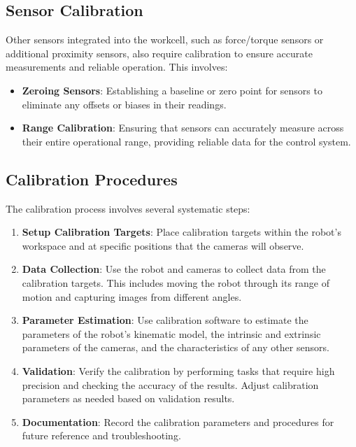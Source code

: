\subsection{Sensor Calibration}
Other sensors integrated into the workcell, such as force/torque sensors or additional proximity sensors, also require calibration to ensure accurate measurements and reliable operation. This involves:

\begin{itemize}
    \item \textbf{Zeroing Sensors}: Establishing a baseline or zero point for sensors to eliminate any offsets or biases in their readings.
    \item \textbf{Range Calibration}: Ensuring that sensors can accurately measure across their entire operational range, providing reliable data for the control system.
\end{itemize}

\subsection{Calibration Procedures}
The calibration process involves several systematic steps:

\begin{enumerate}
    \item \textbf{Setup Calibration Targets}: Place calibration targets within the robot’s workspace and at specific positions that the cameras will observe.
    \item \textbf{Data Collection}: Use the robot and cameras to collect data from the calibration targets. This includes moving the robot through its range of motion and capturing images from different angles.
    \item \textbf{Parameter Estimation}: Use calibration software to estimate the parameters of the robot’s kinematic model, the intrinsic and extrinsic parameters of the cameras, and the characteristics of any other sensors.
    \item \textbf{Validation}: Verify the calibration by performing tasks that require high precision and checking the accuracy of the results. Adjust calibration parameters as needed based on validation results.
    \item \textbf{Documentation}: Record the calibration parameters and procedures for future reference and troubleshooting.
\end{enumerate}


